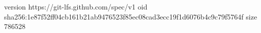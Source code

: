 version https://git-lfs.github.com/spec/v1
oid sha256:1e87f52ff04cb161b21ab9476523f85ec08cad3ecc19f1d6076b4c9c79f5764f
size 786528
